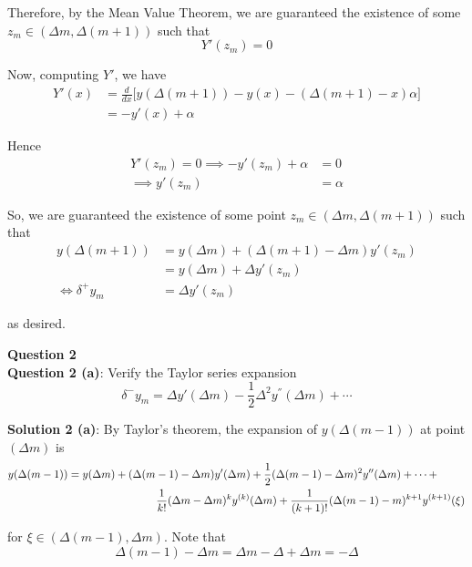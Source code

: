 \documentclass[12pt]{article}
\newlength\tindent
\renewcommand{\indent}{\hspace*{\tindent}}
\begin{document}
\indent Therefore, by the Mean Value Theorem, we are guaranteed the existence of some $z_m \in (\Delta m, \Delta(m + 1))$ such that
\begin{equation*}
	Y'(z_m) = 0 
\end{equation*}

Now, computing $Y'$, we have
\begin{align*}
	Y'(x) &= \frac{d}{dx} \Big[ y(\Delta(m + 1)) - y(x) - (\Delta(m + 1) - x)\alpha \Big] \\
	&= -y'(x) + \alpha
\end{align*}

Hence
\begin{align*}
	Y'(z_m) = 0 \implies -y'(z_m) + \alpha &= 0 \\
	\implies y'(z_m) &= \alpha
\end{align*}

So, we are guaranteed the existence of some point $z_m \in (\Delta m, \Delta(m + 1))$ such that
\begin{align*}
	y(\Delta(m + 1)) &= y(\Delta m) + (\Delta(m + 1) - \Delta m)y'(z_m) \\
	&= y(\Delta m) + \Delta y'(z_m) \\
	\iff \delta^+y_m &= \Delta y'(z_m)
\end{align*}

as desired.

\newpage
{\bf\large Question 2} \\

{\bf Question 2 (a)}: Verify the Taylor series expansion
\begin{equation*}
	\delta^-y_m = \Delta y'(\Delta m) - \frac{1}{2}\Delta^2 y^{''}(\Delta m) + \cdots
\end{equation*}

{\bf Solution 2 (a)}: By Taylor's theorem, the expansion of $y(\Delta (m - 1))$ at point $(\Delta m)$ is
\begin{align*}
	y(\Delta (m - 1)) &= y(\Delta m) + (\Delta (m - 1) - \Delta m)y'(\Delta m) + \frac{1}{2}(\Delta (m - 1) - \Delta m)^2y''(\Delta m) + \cdots + \\
	&\hphantom{{}={-------}} \frac{1}{k!}(\Delta m - \Delta m)^ky^{(k)}(\Delta m) + \frac{1}{(k + 1)!}(\Delta (m - 1) - m)^{k + 1}y^{(k + 1)}(\xi)
\end{align*}

for $\xi \in (\Delta (m - 1), \Delta m)$. Note that
\begin{equation*}
	\Delta (m - 1) - \Delta m = \Delta m - \Delta + \Delta m = -\Delta
\end{equation*}
\end{document}
